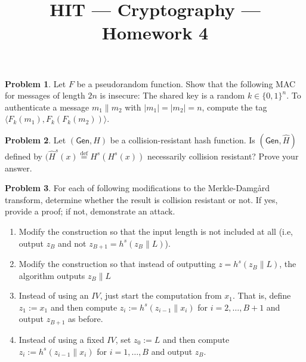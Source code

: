 \documentclass[11pt]{article}
\title{HIT --- Cryptography --- Homework 4}
\theoremstyle{definition}
\providecommand{\abs}[1]{\lvert#1\rvert}
\newtheorem{problem}{Problem}
\begin{document}
\maketitle

\begin{problem}
Let $F$ be a pseudorandom function. Show that the following MAC for messages of length $2n$ is insecure: The shared key is a random $k\in \{0,1\}^n$. To authenticate a message $m_1\| m_2$ with $\abs{m_1} =\abs{m_2} = n$, compute the tag $\langle F_k(m_1), F_k(F_k(m_2))\rangle$. 
\end{problem}

\begin{problem}
Let $(\mathsf{Gen},H)$ be a collision-resistant hash function. Is $(\mathsf{Gen},\hat{H})$ defined by $(\hat{H}^s(x) \overset{\text{def}}{=} H^s(H^s(x))$ necessarily collision resistant? Prove your answer. 
\end{problem}

\begin{problem}
For each of following modifications to the Merkle-Damg\r{a}rd transform, determine whether the result is collision resistant or not. If yes, provide a proof; if not, demonstrate an attack.
\begin{enumerate}
\item Modify the construction so that the input length is not included at all (i.e, output $z_B$ and not $z_{B+1} = h^s(z_B\| L)$).
\item Modify the construction so that instead of outputting $z = h^s(z_B\| L)$, the algorithm outputs $z_B\|L$
\item Instead of using an $IV$, just start the computation from $x_1$. That is, define $z_1 := x_1$ and then compute $z_i := h^s(z_{i-1}\|x_i)$ for $i=2,\dotsc,B+1$ and output $z_{B+1}$ as before.
\item Instead of using a fixed $IV$, set $z_0 := L$ and then compute $z_i := h^s(z_{i-1}\|x_i)$ for $i=1,\dotsc,B$ and output $z_B$.
\end{enumerate}
\end{problem}
\end{document}
